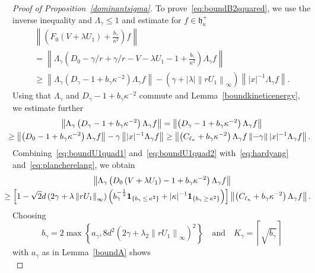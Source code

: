 \documentclass[10pt]{amsart}
\theoremstyle{definition}
\newcommand{\one}{\mathbf{1}}
\newcommand*\gh{\mathfrak{h}}
\newcommand*\ghpk{{\gh^+_\kappa}}
\begin{document}
\begin{proof}[Proof of Proposition~\ref{dominantsigma}]
To prove~\eqref{eq:boundB2squared}, we use the inverse inequality and $\Lambda_\gamma\leq1$ and estimate for $f\in\ghpk$
\begin{multline}\label{eq:boundU1quad1}
\left\|\left(F_0\left(V+\lambda U_1\right)+\frac{b_\gamma}{\kappa^2}\right)f\right\|\\
= \left\|\Lambda_\gamma\left(D_0-\gamma/r+\gamma/r-V-\lambda U_1-1+\frac{b_\gamma}{\kappa^2}\right)\Lambda_\gamma f\right\|\\
\geq \left\|\Lambda_\gamma\left(D_\gamma-1+b_\gamma\kappa^{-2}\right)\Lambda_\gamma f\right\| - \left(\gamma+|\lambda|\left\|rU_1\right\|_\infty\right)\left\||x|^{-1}\Lambda_\gamma f\right\|.
\end{multline}
Using that $\Lambda_\gamma$ and $D_\gamma-1+b_\gamma\kappa^{-2}$ commute and Lemma~\ref{boundkineticenergy}, we estimate further
\begin{multline}\label{eq:boundU1quad2}
\left\|\Lambda_\gamma\left(D_\gamma-1+b_\gamma\kappa^{-2}\right)\Lambda_\gamma f\right\| =\left\|\left(D_\gamma-1+b_\gamma\kappa^{-2}\right)\Lambda_\gamma f\right\|\\
\mkern-10mu
\geq \left\|\left(D_0-1+b_\gamma\kappa^{-2}\right)\Lambda_\gamma f\right\| - \gamma\left\||x|^{-1}\Lambda_\gamma f\right\|
\geq \left\|\left(C_{\ell_\kappa}+b_\gamma\kappa^{-2}\right)\Lambda_\gamma f\left\| - \gamma\right\||x|^{-1}\Lambda_\gamma f\right\|.
\end{multline}
Combining~\eqref{eq:boundU1quad1} and~\eqref{eq:boundU1quad2} with~\eqref{eq:hardyang} and~\eqref{eq:plancherelang}, we obtain
\begin{multline*}
\left\|\Lambda_\gamma\left(D_0\left(V+\lambda U_1\right)-1+b_\gamma\kappa^{-2}\right)\Lambda_\gamma f\right\| \\
\mkern-20mu \geq\left[1-\sqrt{2}d\left(2\gamma+\lambda\left\|rU_1\right\|_\infty\right)\left(b_\gamma^{-\frac12}\one_{\left\{b_\gamma\,\leq\,\kappa^2\right\}} + |\kappa|^{-1}\one_{\left\{b_\gamma\,\geq\,\kappa^2\right\}}\right)\right] \left\|\left(C_{\ell_\kappa}+b_\gamma\kappa^{-2}\right)\Lambda_\gamma f\right\|.
\end{multline*}
Choosing
\begin{equation}\label{eq:gammacond}
b_\gamma = 2\max\left\{a_\gamma,8d^2\left(2\gamma+\lambda_2\left\|rU_1\right\|_\infty\right)^2\right\}
\quad\text{and}\quad K_\gamma = \left\lceil\sqrt{b_\gamma}\right\rceil
\end{equation}
with $a_\gamma$ as in Lemma~\ref{boundA} shows
\begin{equation}\label{eq:boundU1quad}

\end{equation}
\end{proof}
\end{document}
